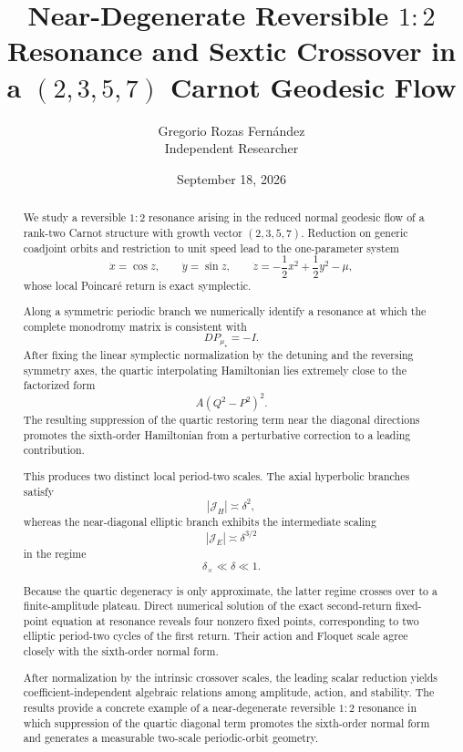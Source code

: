 \documentclass[11pt]{article}
\title{Near-Degenerate Reversible \(1{:}2\) Resonance and Sextic Crossover in a \((2,3,5,7)\) Carnot Geodesic Flow}
\author{Gregorio Rozas Fernández\\\small Independent Researcher}
\date{September 18, 2026}
\theoremstyle{plain}
\theoremstyle{definition}
\theoremstyle{remark}
\newcommand{\mcJ}{\mathcal{J}}
\newcommand{\deltax}{\delta_\times}
\begin{document}
\maketitle

\begin{abstract}
We study a reversible \(1{:}2\) resonance arising in the reduced normal geodesic flow of a rank-two Carnot structure with growth vector \((2,3,5,7)\). Reduction on generic coadjoint orbits and restriction to unit speed lead to the one-parameter system
\[
\dot x=\cos z,\qquad
\dot y=\sin z,\qquad
\dot z=-\frac12x^2+\frac12y^2-\mu,
\]
whose local Poincaré return is exact symplectic.

Along a symmetric periodic branch we numerically identify a resonance at which the complete monodromy matrix is consistent with
\[
DP_{\mu_\star}=-I.
\]
After fixing the linear symplectic normalization by the detuning and the reversing symmetry axes, the quartic interpolating Hamiltonian lies extremely close to the factorized form
\[
A(Q^2-P^2)^2.
\]
The resulting suppression of the quartic restoring term near the diagonal directions promotes the sixth-order Hamiltonian from a perturbative correction to a leading contribution.

This produces two distinct local period-two scales. The axial hyperbolic branches satisfy
\[
|\mcJ_H|\asymp\delta^2,
\]
whereas the near-diagonal elliptic branch exhibits the intermediate scaling
\[
|\mcJ_E|\asymp\delta^{3/2}
\]
in the regime
\[
\deltax\ll\delta\ll1.
\]

Because the quartic degeneracy is only approximate, the latter regime crosses over to a finite-amplitude plateau. Direct numerical solution of the exact second-return fixed-point equation at resonance reveals four nonzero fixed points, corresponding to two elliptic period-two cycles of the first return. Their action and Floquet scale agree closely with the sixth-order normal form.

After normalization by the intrinsic crossover scales, the leading scalar reduction yields coefficient-independent algebraic relations among amplitude, action, and stability. The results provide a concrete example of a near-degenerate reversible \(1{:}2\) resonance in which suppression of the quartic diagonal term promotes the sixth-order normal form and generates a measurable two-scale periodic-orbit geometry.
\end{abstract}










\appendix







\end{document}
